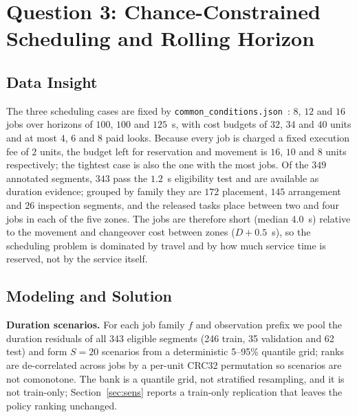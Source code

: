 \documentclass{swmcmthesis}
\begin{document}
\section{Question 3: Chance-Constrained Scheduling and Rolling Horizon}\label{sec:q3}
\subsection{Data Insight}
The three scheduling cases are fixed by \texttt{common\_conditions.json}~\cite{ref8}: $8$, $12$ and $16$ jobs over horizons of $100$, $100$ and $125$~s, with cost budgets of $32$, $34$ and $40$ units and at most $4$, $6$ and $8$ paid looks. Because every job is charged a fixed execution fee of $2$ units, the budget left for reservation and movement is $16$, $10$ and $8$ units respectively; the tightest case is also the one with the most jobs. Of the $349$ annotated segments, $343$ pass the $1.2$~s eligibility test and are available as duration evidence; grouped by family they are $172$ placement, $145$ arrangement and $26$ inspection segments, and the released tasks place between two and four jobs in each of the five zones. The jobs are therefore short (median $4.0$~s) relative to the movement and changeover cost between zones ($D + 0.5$~s), so the scheduling problem is dominated by travel and by how much service time is reserved, not by the service itself.
\subsection{Modeling and Solution}
\textbf{Duration scenarios.} For each job family $f$ and observation prefix we pool the duration residuals of all 343 eligible segments (246 train, 35 validation and 62 test) and form $S=20$ scenarios from a deterministic 5--95\% quantile grid; ranks are de-correlated across jobs by a per-unit CRC32 permutation so scenarios are not comonotone. The bank is a quantile grid, not stratified resampling, and it is not train-only; Section~\ref{sec:sens} reports a train-only replication that leaves the policy ranking unchanged.
\end{document}
